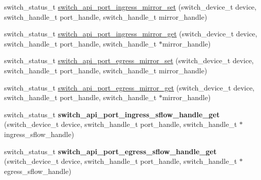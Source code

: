 \begin{DoxyCompactItemize}
\item 
switch\+\_\+status\+\_\+t \hyperlink{group__Port_gaa685800d18d554feebc830175356ed75}{switch\+\_\+api\+\_\+port\+\_\+ingress\+\_\+mirror\+\_\+set} (switch\+\_\+device\+\_\+t device, switch\+\_\+handle\+\_\+t port\+\_\+handle, switch\+\_\+handle\+\_\+t mirror\+\_\+handle)
\item 
switch\+\_\+status\+\_\+t \hyperlink{group__Port_ga047de2566fe33c0984bd41645d4e7f95}{switch\+\_\+api\+\_\+port\+\_\+ingress\+\_\+mirror\+\_\+get} (switch\+\_\+device\+\_\+t device, switch\+\_\+handle\+\_\+t port\+\_\+handle, switch\+\_\+handle\+\_\+t $\ast$mirror\+\_\+handle)
\item 
switch\+\_\+status\+\_\+t \hyperlink{group__Port_ga6d6eae1005fe82102992ad06068e79a9}{switch\+\_\+api\+\_\+port\+\_\+egress\+\_\+mirror\+\_\+set} (switch\+\_\+device\+\_\+t device, switch\+\_\+handle\+\_\+t port\+\_\+handle, switch\+\_\+handle\+\_\+t mirror\+\_\+handle)
\item 
switch\+\_\+status\+\_\+t \hyperlink{group__Port_gaffdc1f3161008ee9a9b687d2f2bb0ace}{switch\+\_\+api\+\_\+port\+\_\+egress\+\_\+mirror\+\_\+get} (switch\+\_\+device\+\_\+t device, switch\+\_\+handle\+\_\+t port\+\_\+handle, switch\+\_\+handle\+\_\+t $\ast$mirror\+\_\+handle)
\item 
\hypertarget{group__Port_gad40dab8e3a968e4c51fd1299f8d00a59}{switch\+\_\+status\+\_\+t {\bfseries switch\+\_\+api\+\_\+port\+\_\+ingress\+\_\+sflow\+\_\+handle\+\_\+get} (switch\+\_\+device\+\_\+t device, switch\+\_\+handle\+\_\+t port\+\_\+handle, switch\+\_\+handle\+\_\+t $\ast$ingress\+\_\+sflow\+\_\+handle)}\label{group__Port_gad40dab8e3a968e4c51fd1299f8d00a59}

\item 
\hypertarget{group__Port_gaab87014e74ae65e6a847cf410d726bb8}{switch\+\_\+status\+\_\+t {\bfseries switch\+\_\+api\+\_\+port\+\_\+egress\+\_\+sflow\+\_\+handle\+\_\+get} (switch\+\_\+device\+\_\+t device, switch\+\_\+handle\+\_\+t port\+\_\+handle, switch\+\_\+handle\+\_\+t $\ast$egress\+\_\+sflow\+\_\+handle)}\label{group__Port_gaab87014e74ae65e6a847cf410d726bb8}


\end{DoxyCompactItemize}

